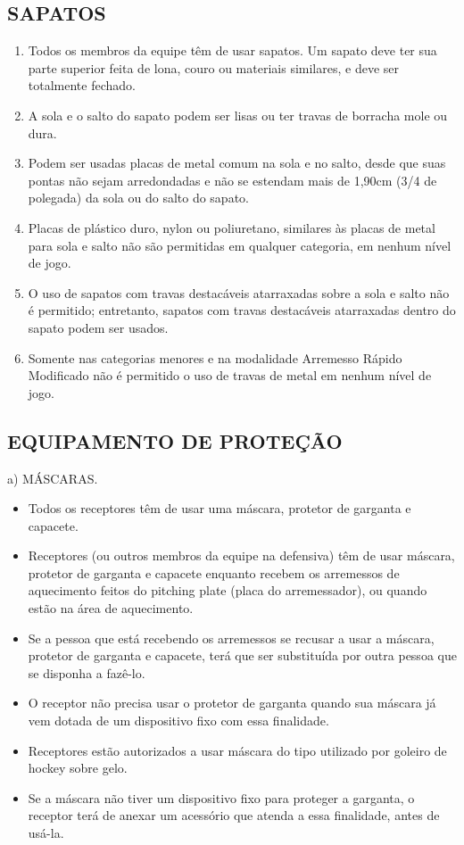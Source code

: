 \subsection{SAPATOS}
\begin{enumerate}[label=(\alph*)]
	\item Todos os membros da equipe têm de usar sapatos. Um sapato deve ter sua  parte superior feita de lona, couro ou materiais similares, e deve ser totalmente fechado.
	\item A sola e o salto do sapato podem ser lisas ou ter travas de borracha mole ou dura.
	\item Podem ser usadas placas de metal comum na sola e no salto, desde que suas pontas não sejam arredondadas e não se estendam mais de 1,90cm (3/4 de polegada) da sola ou do salto do sapato.
	\item Placas de plástico duro, nylon ou poliuretano, similares às placas de metal para sola e salto não são permitidas em qualquer categoria, em nenhum nível de jogo.
	\item O uso de sapatos com travas destacáveis atarraxadas sobre a sola e salto não é permitido; entretanto, sapatos com travas destacáveis atarraxadas dentro do sapato podem ser usados.
	\item Somente nas categorias menores e na modalidade Arremesso Rápido Modificado não é permitido o uso de travas de metal em nenhum nível de jogo.
\end{enumerate}


\subsection{EQUIPAMENTO DE PROTEÇÃO}

a) MÁSCARAS.
\begin{itemize}
	\item Todos os receptores têm de usar uma máscara, protetor de garganta e capacete.

	\item Receptores (ou outros membros da equipe na defensiva) têm de usar máscara, protetor de garganta e capacete enquanto recebem os arremessos de aquecimento feitos do \gls{pitching plate} (placa do arremessador), ou quando estão na área de aquecimento.

	\item Se a pessoa que está recebendo os arremessos se recusar a usar a máscara, protetor de garganta e capacete, terá que ser substituída por outra pessoa que se disponha a fazê-lo.

	\item O receptor não precisa usar o protetor de garganta quando sua máscara já vem dotada de um dispositivo fixo com essa finalidade.

	\item Receptores estão autorizados a usar máscara do tipo utilizado por goleiro de hockey sobre gelo.

	\item Se a máscara não tiver um dispositivo fixo para proteger a garganta, o receptor terá de anexar um acessório que atenda a essa finalidade, antes de usá-la.

\end{itemize}

